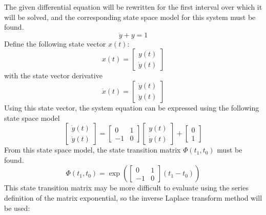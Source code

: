 \begin{example}
  The given differential equation will be rewritten for the first interval over which it will be solved, and the corresponding state space model for this system must be found.
  \begin{equation*}
    \ddot{y}+y=1
  \end{equation*}
  Define the following state vector $x(t)$:
  \begin{equation*}
    x(t)=\begin{bmatrix} y(t) \\ \dot{y}(t) \end{bmatrix}
  \end{equation*}
  with the state vector derivative
  \begin{equation*}
    \dot{x}(t)=\begin{bmatrix} \dot{y}(t) \\ \ddot{y}(t) \end{bmatrix}
  \end{equation*}
  Using this state vector, the system equation can be expressed using the following state space model
  \begin{equation*}
    \begin{bmatrix}
      \dot{y}(t) \\ \ddot{y}(t)
    \end{bmatrix}=
    \begin{bmatrix}
      0 & 1 \\ -1 & 0
    \end{bmatrix}
    \begin{bmatrix}
      y(t) \\ \dot{y}(t)
    \end{bmatrix}+
    \begin{bmatrix}
      0 \\ 1
    \end{bmatrix}
  \end{equation*}
  From this state space model, the state transition matrix $\Phi(t_{1},t_{0})$ must be found.
  \begin{equation*}
    \Phi(t_{1},t_{0})=\exp
    \left(
      \begin{bmatrix}
        0 & 1 \\ -1 & 0
      \end{bmatrix}(t_{1}-t_{0})
    \right)
  \end{equation*}
  This state transition matrix may be more difficult to evaluate using the series definition of the matrix exponential, so the inverse Laplace transform method will be used:
  \begin{equation*}

\end{equation*}
\end{example}
